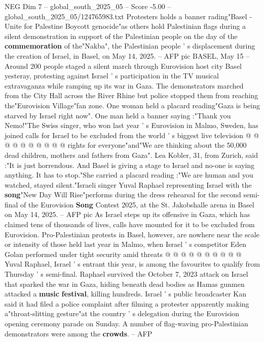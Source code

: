 \begin{textsample}{NEG Dim 7 – global\_south\_2025\_05 – Score -5.00 – global\_south\_2025\_05/124765983.txt}  \label{ex:f7_neg_215}
Protesters holds a banner rading"Basel - Unite for Palestine Boycott genocide"as others hold Palestinian flags during a silent demonstration in support of the Palestinian people on the day of the \textbf{commemoration} of the"Nakba", the Palestinian people ' s displacement during the creation of Israel, in Basel, on May 14, 2025. -- AFP pic BASEL, May 15 -- Around 200 people staged a silent march through Eurovision host city Basel yesteray, protesting against Israel ' s participation in the TV musical extravaganza while ramping up its war in Gaza.
The demonstrators marched from the City Hall across the River Rhine but police stopped them from reaching the"Eurovision Village"fan zone.
One woman held a placard reading"Gaza is being starved by Israel right now".
One man held a banner saying :"Thank you Nemo!"The Swiss singer, who won last year ' s Eurovision in Malmo, Sweden, has joined calls for Israel to be excluded from the world ' s biggest live television @ @ @ @ @ @ @ @ @ @ rights for everyone"and"We are thinking about the 50,000 dead children, mothers and fathers from Gaza".
Lea Kobler, 31, from Zurich, said :"It is just horrendous.
And Basel is giving a stage to Israel and no-one is saying anything.
It has to stop."She carried a placard reading :"We are human and you watched, stayed silent."Israeli singer Yuval Raphael representing Israel with the \textbf{song}"New Day Will Rise"performs during the dress rehearsal for the second semi-final of the Eurovision \textbf{Song} Contest 2025, at the St.
Jakobshalle arena in Basel on May 14, 2025. -- AFP pic As Israel steps up its offensive in Gaza, which has claimed tens of thousands of lives, calls have mounted for it to be excluded from Eurovision.
Pro-Palestinian protests in Basel, however, are nowhere near the scale or intensity of those held last year in Malmo, when Israel ' s competitor Eden Golan performed under tight security amid threats @ @ @ @ @ @ @ @ @ @ Yuval Raphael, Israel ' s entrant this year, is among the favourites to qualify from Thursday ' s semi-final.
Raphael survived the October 7, 2023 attack on Israel that sparked the war in Gaza, hiding beneath dead bodies as Hamas gunmen attacked a \textbf{music} \textbf{festival}, killing hundreds.
Israel ' s public broadcaster Kan said it had filed a police complaint after filming a protester apparently making a"throat-slitting gesture"at the country ' s delegation during the Eurovision opening ceremony parade on Sunday.
A number of flag-waving pro-Palestinian demonstrators were among the \textbf{crowds}. -- AFP

\end{textsample}
